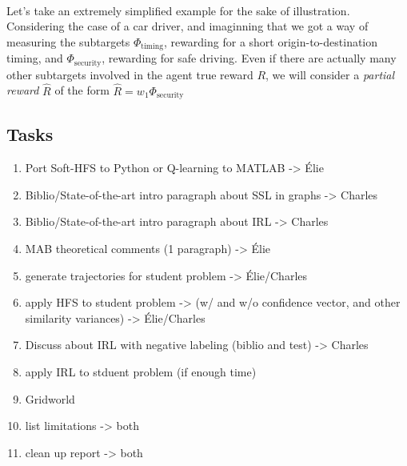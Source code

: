 \documentclass{article}
\begin{document}
\paragraph{}
Let's take an extremely simplified example for the sake of illustration. Considering the case of a car driver, and imaginning that we got a way of measuring the subtargets $\Phi_{\text{timing}}$, rewarding for a short origin-to-destination timing, and $\Phi_{\text{security}}$, rewarding for safe driving. Even if there are actually many other subtargets involved in the agent true reward $R$, we will consider a \emph{partial reward} $\hat R$ of the form $\hat R = w_1 \Phi_{\text{security}}$








\begin{appendices}
\section{Tasks}

\begin{enumerate}
    \item Port Soft-HFS to Python or Q-learning to MATLAB -> Élie
    \item Biblio/State-of-the-art intro paragraph about SSL in graphs -> Charles
    \item Biblio/State-of-the-art intro paragraph about IRL -> Charles
    \item MAB theoretical comments (1 paragraph) -> Élie
    \item generate trajectories for student problem -> Élie/Charles
    \item apply HFS to student problem -> (w/ and w/o confidence vector, and other similarity variances) -> Élie/Charles
    \item Discuss about IRL with negative labeling (biblio and test) -> Charles
    \item apply IRL to stduent problem (if enough time)
    \item Gridworld
    \item list limitations -> both
    \item clean up report -> both
\end{enumerate}


\end{appendices}
\end{document}

